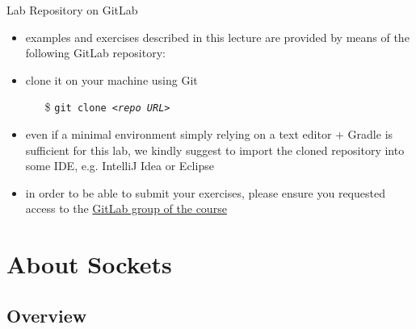 \documentclass[presentation]{beamer}\mode<presentation>{\usetheme{AMSBolognaFC}}
\begin{document}
\begin{frame}[c]{Lab \labN{} Repository on GitLab}

	\begin{itemize}
		\item examples and exercises described in this lecture are provided by means of the following GitLab repository:
		\begin{center}
			\uurl{\labRepo}
		\end{center}

		\vfill

		\item clone it on your machine using Git
		\begin{itemize}
		    \item[\$] \texttt{git clone \textit{<repo URL>}}
		\end{itemize}

		\vfill

		\item even if a minimal environment simply relying on a text editor + Gradle is sufficient for this lab, we kindly suggest to import the cloned repository into some IDE, e.g. IntelliJ Idea or Eclipse

		\vfill

		\item in order to be able to submit your exercises, please ensure you requested access to the \href{\gitlabGroup}{GitLab group of the course}
	\end{itemize}

\end{frame}

\section{About Sockets}

\subsection{Overview}
\end{document}
